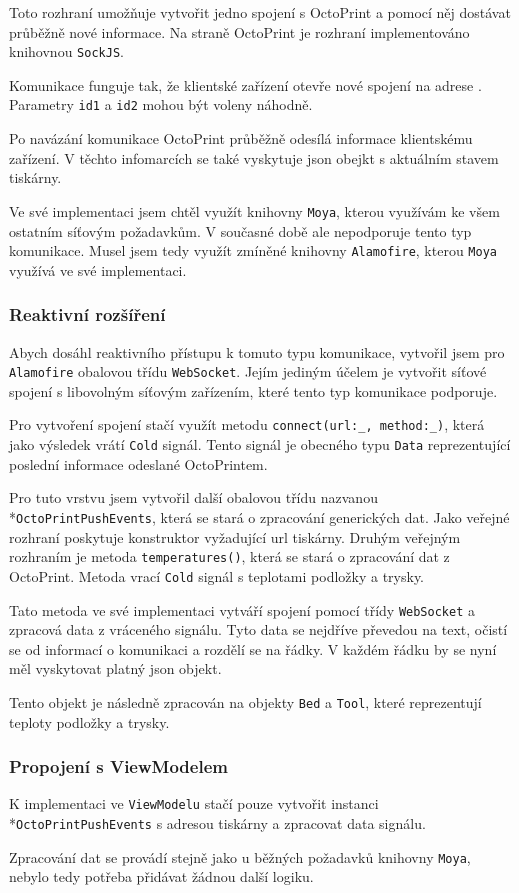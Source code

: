 Toto rozhraní umožňuje vytvořit jedno spojení s OctoPrint a pomocí něj dostávat průběžně nové informace.
Na straně OctoPrint je rozhraní implementováno knihovnou \texttt{SockJS}.

Komunikace funguje tak, že klientské zařízení otevře nové spojení na adrese .
Parametry \texttt{id1} a \texttt{id2} mohou být voleny náhodně.

Po navázání komunikace OctoPrint průběžně odesílá informace klientskému zařízení.
V těchto infomarcích se také vyskytuje \acrshort{json} obejkt s aktuálním stavem tiskárny.

Ve své implementaci jsem chtěl využít knihovny \texttt{Moya}, kterou využívám ke všem ostatním síťovým požadavkům.
V současné době ale nepodporuje tento typ komunikace.
Musel jsem tedy využít zmíněné knihovny \texttt{Alamofire}, kterou \texttt{Moya} využívá ve své implementaci.

\subsubsection*{Reaktivní rozšíření}

Abych dosáhl reaktivního přístupu k tomuto typu komunikace, vytvořil jsem pro \texttt{Alamofire} obalovou třídu \texttt{WebSocket}.
Jejím jediným účelem je vytvořit síťové spojení s libovolným síťovým zařízením, které tento typ komunikace podporuje.

Pro vytvoření spojení stačí využít metodu \texttt{connect(url:\_, method:\_)}, která jako výsledek vrátí \texttt{Cold} signál.
Tento signál je obecného typu \texttt{Data} reprezentující poslední informace odeslané OctoPrintem.

Pro tuto vrstvu jsem vytvořil další obalovou třídu nazvanou\\*\texttt{OctoPrintPushEvents}, která se stará o zpracování generických dat.
Jako veřejné rozhraní poskytuje konstruktor vyžadující \acrshort{url} tiskárny.
Druhým veřejným rozhraním je metoda \texttt{temperatures()}, která se stará o zpracování dat z OctoPrint.
Metoda vrací \texttt{Cold} signál s teplotami podložky a trysky.

Tato metoda ve své implementaci vytváří spojení pomocí třídy \texttt{WebSocket} a zpracová data z vráceného signálu.
Tyto data se nejdříve převedou na text, očistí se od informací o komunikaci a rozdělí se na řádky.
V každém řádku by se nyní měl vyskytovat platný \acrshort{json} objekt.

Tento objekt je následně zpracován na objekty \texttt{Bed} a \texttt{Tool}, které reprezentují teploty podložky a trysky.

\subsubsection*{Propojení s ViewModelem}

K implementaci ve \texttt{ViewModelu} stačí pouze vytvořit instanci\\*\texttt{OctoPrintPushEvents} s adresou tiskárny a zpracovat data signálu.

Zpracování dat se provádí stejně jako u běžných požadavků knihovny \texttt{Moya}, nebylo tedy potřeba přidávat žádnou další logiku.
